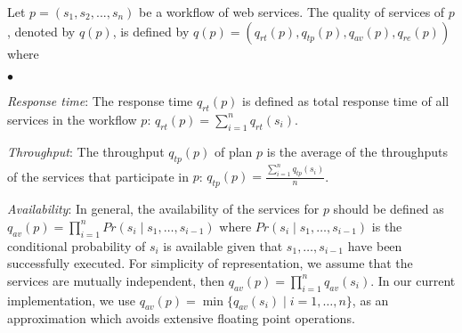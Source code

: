 \documentclass{new_tlp}
\begin{document}

Let $p = (s_1,s_2,...,s_n)$ be a workflow of web services. The quality of services of $p$, denoted by $q(p)$, 
is defined by  $q(p) = (q_{rt}(p), q_{tp}(p), q_{av}(p), q_{re}(p))$ where 
%
\begin{list}{$\bullet$}{\itemsep=0pt \parsep=0pt \topsep=0pt \leftmargin=10pt}
    \item {\em Response time}: The response time $q_{rt}(p)$ is defined as total response time of all  services in the workflow $p$: $q_{rt}(p) = \sum_{i=1}^{n} q_{rt}(s_i)$. 
    
    \item {\em Throughput}: The throughput $q_{tp}(p)$ of plan $p$ is the average of the throughputs of the services that participate in $p$: $q_{tp}(p) = \frac{\sum_{i=1}^{n} q_{tp}(s_i)}{n}$. 
    
    \item {\em Availability}: In general, the availability of the services for $p$ should be defined as 
    $q_{av}(p) = \prod_{i=1}^{n} Pr(s_i \mid s_1,\ldots,s_{i-1})$ where $Pr(s_i \mid s_1,\ldots,s_{i-1})$ is the conditional probability of $s_i$ is available given that $s_1,\ldots,s_{i-1}$ have been successfully executed. For simplicity of  representation, we assume that the services are mutually independent, then  $q_{av}(p) = \prod_{i=1}^{n} q_{av}(s_i)$. In our current implementation, we use $q_{av}(p) = \min \{q_{av}(s_i) \mid i =1,\ldots,n\}$, as an approximation which avoids extensive floating point operations.


\end{list}
\end{document}
